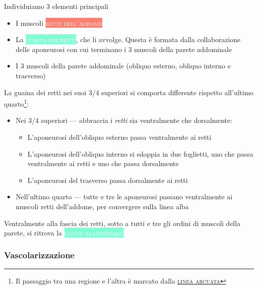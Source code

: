 \documentclass[italian,]{article}
\providecommand{\tightlist}{%
  \setlength{\itemsep}{0pt}\setlength{\parskip}{0pt}}
\newcommand{\mus}[1]{\colorbox{Salmon}{\textcolor{white}{\textsc{#1}}}}
\newcommand{\tol}[1]{\colorbox{Aquamarine}{\textcolor{white}{\textsc{#1}}}}
\renewcommand{\a}[1]{\underline{\textsc{#1}}}
\newcommand{\netter}[1]{ \fbox{\textsf{Netter (2014), tav. #1}} }
\newcommand{\normalbox}[2]{\begin{tcolorbox}[title=#1]#2\end{tcolorbox}} %
\begin{document}
\normalbox{Sezione trasversale dell'addome}{

\netter{248}

Individuiamo 3 elementi principali

\begin{itemize}
\tightlist
\item
  I muscoli \mus{retti dell'addome}
\item
  La \tol{guaina dei retti}, che li avvolge. Questa è formata dalla
  collaborazione delle aponeurosi con cui terminano i 3 muscoli della
  parete addominale
\item
  I 3 muscoli della parete addominale (obliquo esterno, obliquo interno
  e trasverso)
\end{itemize}

La guaina dei retti nei suoi 3/4 superiori si comporta differente
rispetto all'ultimo quarto\footnote{Il passaggio tra una regione e
  l'altra è marcato dalla \a{linea arcuata}}:

\begin{itemize}
\tightlist
\item
  Nei 3/4 superiori --- abbraccia i \emph{retti} sia ventralmente che
  dorsalmente:

  \begin{itemize}
  \tightlist
  \item
    L'aponeurosi dell'obliquo esterno passa ventralmente ai retti
  \item
    L'aponeurosi dell'obliquo interno si sdoppia in due foglietti, uno
    che passa ventralmente ai retti e uno che passa dorsalmente
  \item
    L'aponeurosi del trasverso passa dorsalmente ai retti
  \end{itemize}
\item
  Nell'ultimo quarto --- tutte e tre le aponeurosi passano ventralmente
  ai muscoli retti dell'addome, per convergere sulla linea alba
\end{itemize}

Ventralmente alla fascia dei retti, sotto a tutti e tre gli ordini di
muscoli della parete, si ritrova la \tol{fascia trasversalis}
}

\hypertarget{vascolarizzazione-3}{%
\subsubsection{Vascolarizzazione}\label{vascolarizzazione-3}}
\end{document}
